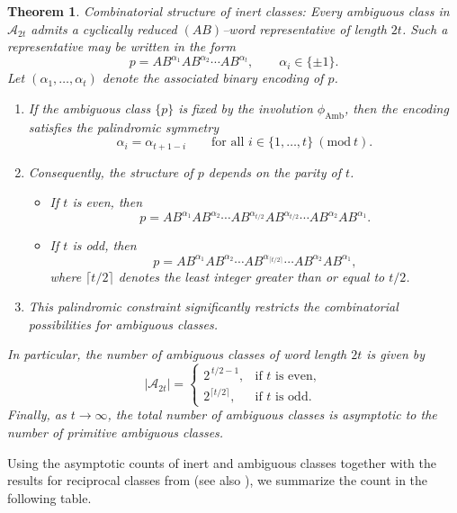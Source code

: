 \documentclass[a4paper,12pt]{amsart}
\numberwithin{equation}{section}
\newtheorem{theorem}{Theorem}[section]
\theoremstyle{definition}
\numberwithin{equation}{section}
\begin{document}
  \begin{theorem}\label{amb} {Combinatorial structure of inert classes:} Every ambiguous class in $\mathcal A_{2t}$ admits a cyclically reduced $(AB)$--word representative of length $2t$. Such a representative may be written in the form
  \[
  p = AB^{\alpha_1} AB^{\alpha_2} \cdots AB^{\alpha_t}, \qquad \alpha_i \in \{\pm 1\}.
  \]
  Let $(\alpha_1,\ldots,\alpha_t)$ denote the associated binary encoding of $p$.
  \begin{enumerate}
  \item If the ambiguous class $\{p\}$ is fixed by the involution $\phi_{\mathrm{Amb}}$, then the encoding satisfies the palindromic symmetry
    \[
    \alpha_i = \alpha_{t+1-i} \qquad \text{for all } i \in \{1,\ldots,t\} \ (\mathrm{mod}\ t).
    \]
    \item Consequently, the structure of $p$ depends on the parity of $t$.
    \begin{itemize}
    \item If $t$ is even, then
        \[
        p = AB^{\alpha_1} AB^{\alpha_2} \cdots AB^{\alpha_{t/2}}
        AB^{\alpha_{t/2}} \cdots AB^{\alpha_2} AB^{\alpha_1}.
        \]
        
        \item If $t$ is odd, then
        \[
        p = AB^{\alpha_1} AB^{\alpha_2} \cdots AB^{\alpha_{\lceil t/2\rceil}}
        \cdots AB^{\alpha_2} AB^{\alpha_1},
        \]
    where $\lceil t/2\rceil$ denotes the least integer greater than or equal to $t/2$.
    \end{itemize}
    \item This palindromic constraint significantly restricts the combinatorial possibilities for ambiguous classes.
    \end{enumerate}
    In particular, the number of ambiguous classes of word length $2t$ is given by
    \[
    \lvert \mathcal A_{2t} \rvert =
    \begin{cases}
    2^{\,t/2-1}, & \text{if } t \text{ is even},\\[6pt]2^{\lceil t/2\rceil}, & \text{if } t \text{ is odd}.
    \end{cases}
    \]
    Finally, as $t \to \infty$, the total number of ambiguous classes is asymptotic to the number of primitive ambiguous classes.
\end{theorem} 
\fi

Using the asymptotic counts of inert and ambiguous classes together with the results for reciprocal classes from \cite{combigrowth} (see also \cite{dg2025}), we summarize the count in the following table.\\  
\end{document}
